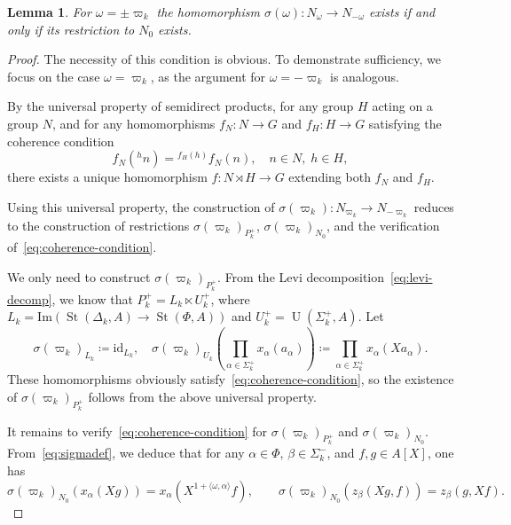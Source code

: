 \documentclass[oneside, 10pt]{amsart}
\DeclareMathOperator{\St}{St}
\DeclareMathOperator{\UU}{U}
\numberwithin{equation}{section}
\numberwithin{thm}{section}
\newtheorem{lemma}[thm]{Lemma}
\numberwithin{lemma}{section}
\theoremstyle{definition}
\theoremstyle{remark}
\begin{document}
\begin{lemma} \label{lem:relative-reduction}
For $\omega = \pm \varpi_k$ the homomorphism $\sigma(\omega)\colon N_\omega \to N_{-\omega}$ exists if and only if its restriction to $N_0$ exists.
\end{lemma}
\begin{proof}
The necessity of this condition is obvious.
To demonstrate sufficiency, we focus on the case $\omega = \varpi_k$, as the argument for $\omega = -\varpi_k$ is analogous.

By the universal property of semidirect products, for any group $H$ acting on a group $N$, and for any homomorphisms $f_N\colon N \to G$ and $f_H\colon H \to G$ satisfying the coherence condition
\begin{equation}
\label{eq:coherence-condition}
f_N({}^hn) = {}^{f_H(h)} f_N(n), \quad n \in N, \; h \in H,
\end{equation}
there exists a unique homomorphism $f\colon N \rtimes H \to G$ extending both $f_N$ and $f_H$.

Using this universal property, the construction of \( \sigma(\varpi_k) \colon N_{\varpi_k} \to N_{-\varpi_k} \) reduces to the construction of
restrictions \( \sigma(\varpi_k)_{P_k^+} \), \( \sigma(\varpi_k)_{N_0} \), and the verification of~\eqref{eq:coherence-condition}.

We only need to construct \( \sigma(\varpi_k)_{P_k^+} \).
From the Levi decomposition~\eqref{eq:levi-decomp}, we know that \( P_k^+ = L_k \ltimes U_k^+ \), where \( L_k = \mathrm{Im}(\St(\Delta_k, A) \to \St(\Phi, A)) \) and
\( U_k^+ = \UU(\Sigma_k^+, A) \).
Let
\begin{equation} \label{eq:sigma-Pk}
\sigma(\varpi_k)_{L_k} \coloneqq \mathrm{id}_{L_k}, \quad
\sigma(\varpi_k)_{U_k} \left(\prod_{\alpha \in \Sigma_k^+} x_\alpha(a_\alpha)\right) \coloneqq \prod_{\alpha \in \Sigma_k^+} x_\alpha(Xa_\alpha).
\end{equation}
These homomorphisms obviously satisfy~\eqref{eq:coherence-condition}, so the existence of \( \sigma(\varpi_k)_{P_k^+} \) follows from the above universal property.

It remains to verify~\eqref{eq:coherence-condition} for \( \sigma(\varpi_k)_{P_k^+} \) and \( \sigma(\varpi_k)_{N_0} \).
From~\eqref{eq:sigmadef}, we deduce that for any \( \alpha \in \Phi \), \( \beta \in \Sigma_k^- \), and \( f, g \in A[X] \), one has
\begin{equation} \label{eq:charact}
\sigma(\varpi_k)_{N_0}(x_\alpha(Xg)) = x_\alpha(X^{1 + \langle \omega, \alpha \rangle}f), \qquad
\sigma(\varpi_k)_{N_0}(z_\beta(Xg, f)) = z_\beta(g, Xf).
\end{equation}


\end{proof}
\end{document}
